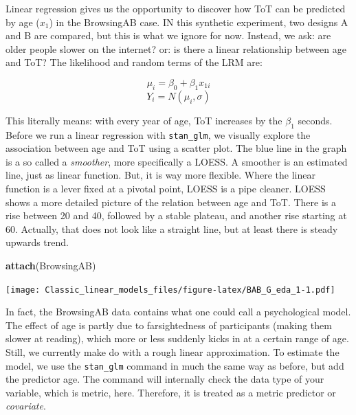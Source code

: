 \documentclass[]{svmono}
\newenvironment{Shaded}{\begin{snugshade}}{\end{snugshade}}
\newcommand{\KeywordTok}[1]{\textcolor[rgb]{0.13,0.29,0.53}{\textbf{#1}}}
\newcommand{\DataTypeTok}[1]{\textcolor[rgb]{0.13,0.29,0.53}{#1}}
\newcommand{\DecValTok}[1]{\textcolor[rgb]{0.00,0.00,0.81}{#1}}
\newcommand{\StringTok}[1]{\textcolor[rgb]{0.31,0.60,0.02}{#1}}
\newcommand{\OperatorTok}[1]{\textcolor[rgb]{0.81,0.36,0.00}{\textbf{#1}}}
\newcommand{\NormalTok}[1]{#1}
\theoremstyle{definition}
\theoremstyle{definition}
\theoremstyle{definition}
\theoremstyle{remark}
\begin{document}
Linear regression gives us the opportunity to discover how ToT can be
predicted by age (\(x_1\)) in the BrowsingAB case. IN this synthetic
experiment, two designs A and B are compared, but this is what we ignore
for now. Instead, we ask: are older people slower on the internet? or:
is there a linear relationship between age and ToT? The likelihood and
random terms of the LRM are:

\[\mu_i = \beta_0 + \beta_1x_{1i}\] \[Y_i = N(\mu_i, \sigma)\]

This literally means: with every year of age, ToT increases by the
\(\beta_1\) seconds. Before we run a linear regression with
\texttt{stan\_glm}, we visually explore the association between age and
ToT using a scatter plot. The blue line in the graph is a so called a
\emph{smoother}, more specifically a LOESS. A smoother is an estimated
line, just as linear function. But, it is way more flexible. Where the
linear function is a lever fixed at a pivotal point, LOESS is a pipe
cleaner. LOESS shows a more detailed picture of the relation between age
and ToT. There is a rise between 20 and 40, followed by a stable
plateau, and another rise starting at 60. Actually, that does not look
like a straight line, but at least there is steady upwards trend.

\begin{Shaded}
\begin{Highlighting}[]
\KeywordTok{attach}\NormalTok{(BrowsingAB)}
\end{Highlighting}
\end{Shaded}

\begin{Shaded}
\end{Shaded}

\texttt{[image: Classic\_linear\_models\_files/figure-latex/BAB\_G\_eda\_1-1.pdf]}

In fact, the BrowsingAB data contains what one could call a
psychological model. The effect of age is partly due to farsightedness
of participants (making them slower at reading), which more or less
suddenly kicks in at a certain range of age. Still, we currently make do
with a rough linear approximation. To estimate the model, we use the
\texttt{stan\_glm} command in much the same way as before, but add the
predictor age. The command will internally check the data type of your
variable, which is metric, here. Therefore, it is treated as a metric
predictor or \emph{covariate}.
\end{document}

